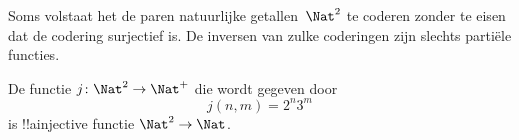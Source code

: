 \documentclass[../../../include/open-logic-section]{subfiles}
\begin{document}
Soms volstaat het de paren natuurlijke getallen~$\Nat^2$ te coderen zonder te
eisen dat de codering surjectief is. De inversen van zulke coderingen zijn
slechts partiële functies.

\begin{ex}
De functie $j\colon \Nat^2 \to \Nat^+$ die wordt gegeven door
\[
j(n,m) = 2^n3^m
\]
is !!a{injective} functie $\Nat^2 \to \Nat$.
\end{ex}
\end{document}
